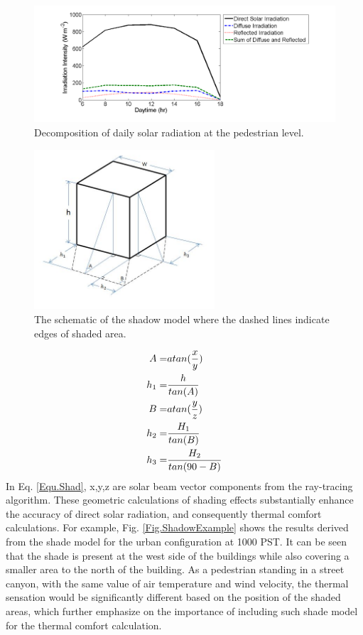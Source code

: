 \documentclass[smallextended]{svjour3}
\begin{document}
\begin{figure}[!h]
\graphicspath{ {image/} }
\centerline{\includegraphics[width=14cm]{solar_intensity.png}}
\caption{Decomposition of daily solar radiation at the pedestrian level.}
\label{Fig.SolarIntensity}
\end{figure}

\begin{figure}[!h]
\graphicspath{ {image/} }
\centerline{\includegraphics[width=0.6\textwidth]{SVFModel.JPG}}
\caption{The schematic of the shadow model  where the dashed lines indicate edges of shaded area.}
\label{Fig.Shadow}
\end{figure}


\begin{equation}
\centering
\begin{split}
A=&atan(\frac{x}{y})\\
h_1=&\frac{h}{tan(A)}\\
B=&atan(\frac{y}{z})\\
h_2=&\frac{H_1}{tan(B)}\\
h_3=&\frac{H_2}{tan(90-B)}
\end{split}
\label{Equ.Shad}
\end{equation}
In Eq. \ref{Equ.Shad}, x,y,z are solar beam vector components from the ray-tracing algorithm. These geometric calculations of shading effects substantially enhance the accuracy of direct solar radiation, and consequently thermal comfort calculations. For example, Fig. \ref{Fig.ShadowExample} shows the results derived from the shade model for the urban configuration at 1000 PST. It can be seen that the shade is present at the west side of the buildings while also covering a smaller area to the north of the building. As a pedestrian standing in a street canyon, with the same value of air temperature and wind velocity, the thermal sensation would be significantly different based on the position of the shaded areas, which further emphasize on the importance of including such shade model for the thermal comfort calculation. 
\end{document}
